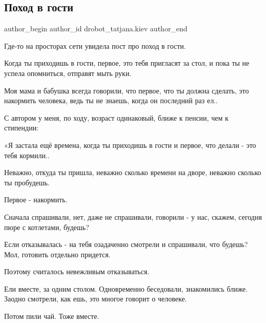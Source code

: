  
 
 
 
 
 
\subsection{Поход в гости}
\label{sec:14_09_2021.fb.drobot_tatjana.kiev.1.pohod_v_gosti}
 
\ifcmt
 author_begin
   author_id drobot_tatjana.kiev
 author_end
\fi

Где-то на просторах сети увидела пост про поход в гости. 

Когда ты приходишь в гости, первое, это тебя пригласят за стол, и пока ты не
успела опомниться, отправят мыть руки. 


Моя мама и бабушка всегда говорили, что первое, что ты должна сделать, это
накормить человека, ведь ты не знаешь, когда он последний раз ел..

С автором у меня, по ходу, возраст одинаковый, ближе к пенсии, чем к стипендии:

«Я застала ещё времена, когда ты приходишь в гости и первое, что делали - это
тебя кормили..

Неважно, откуда ты пришла, неважно сколько времени на дворе, неважно сколько ты
пробудешь.

Первое - накормить.

Сначала спрашивали, нет, даже не спрашивали, говорили - у нас, скажем, сегодня
пюре с котлетами, будешь? 

Если отказывалась - на тебя озадаченно смотрели и спрашивали, что будешь? Мол,
готовить отдельно придется.

Поэтому считалось невежливым отказываться.

Ели вместе, за одним столом. Одновременно беседовали, знакомились ближе. Заодно
смотрели, как ешь, это многое говорит о человеке.

Потом пили чай. Тоже вместе.

